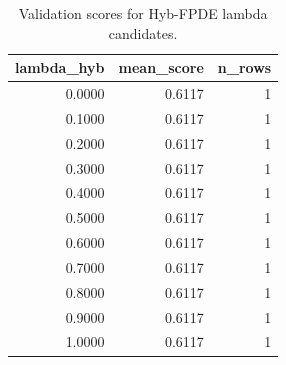 \begin{table}[t]
\caption{Validation scores for Hyb-FPDE lambda candidates.}
\label{tab:lambda_distribution_computed}
\centering
\begin{tabular}{rrr}
\toprule
lambda\_hyb & mean\_score & n\_rows \\
\midrule
0.0000 & 0.6117 & 1 \\
0.1000 & 0.6117 & 1 \\
0.2000 & 0.6117 & 1 \\
0.3000 & 0.6117 & 1 \\
0.4000 & 0.6117 & 1 \\
0.5000 & 0.6117 & 1 \\
0.6000 & 0.6117 & 1 \\
0.7000 & 0.6117 & 1 \\
0.8000 & 0.6117 & 1 \\
0.9000 & 0.6117 & 1 \\
1.0000 & 0.6117 & 1 \\
\bottomrule
\end{tabular}

\end{table}
